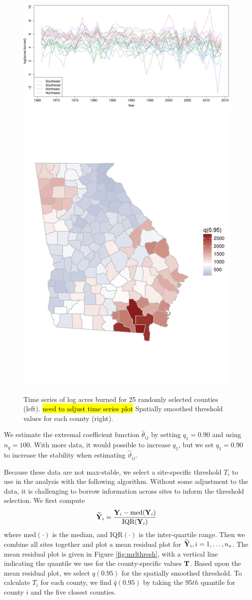 \documentclass[11pt]{article}
\begin{document}
\vspace{2em} %

\begin{figure}[htbp]  %
  \centering
  \includegraphics[width=0.47\linewidth]{plots/fire-spag-rand-25}
  \includegraphics[width=0.47\linewidth, trim = 0 10em 0 10em]{plots/fire-spatial-q95.pdf}
  \caption{Time series of log acres burned for 25 randomly selected counties (left). \hl{need to adjust time series plot} Spatially smoothed threshold values for each county (right).}
  \label{fig:firets25}
\end{figure}

We estimate the extremal coefficient function $\hat{\theta}_{ij}$ by setting $q_1 = 0.90$ and using $n_q = 100$.
With more data, it would possible to increase $q_1$, but we set $q_1 = 0.90$ to increase the stability when estimating $\hat{\vartheta}_{ij}$.

Because these data are not max-stable, we select a site-specific threshold $T_i$ to use in the analysis with the following algorithm.
Without some adjustment to the data, it is challenging to borrow information across sites to inform the threshold selection.
We first compute
\begin{align}
  \widetilde{\mbox{\bf Y}}_i = \frac{\mbox{\bf Y}_i - \text{med}(\mbox{\bf Y}_i)}{\text{IQR}(\mbox{\bf Y}_i)}
\end{align}
where med$(\cdot)$ is the median, and IQR$(\cdot)$ is the inter-quartile range.
Then we combine all sites together and plot a mean residual plot for $\widetilde{\mbox{\bf Y}}_i, i = 1, \ldots, n_s$.
The mean residual plot is given in Figure \ref{fig:mrlthresh}, with a vertical line indicating the quantile we use for the county-specific values $\mbox{\bf T}$.
Based upon the mean residual plot, we select $q(0.95)$ for the spatially smoothed threshold.
To calculate $T_i$ for each county, we find $\hat{q}(0.95)$ by taking the 95$th$ quantile for county $i$ and the five closest counties.
\end{document}
